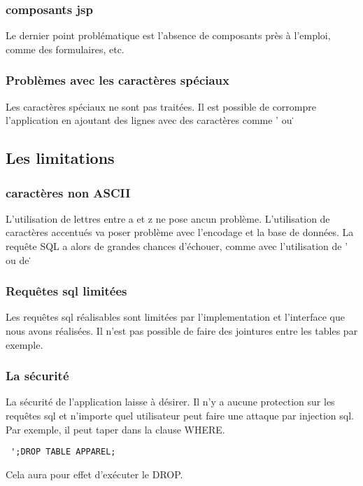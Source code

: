 \subsubsection{composants jsp}
Le dernier point problématique est l'absence de composants près à l'emploi, comme des formulaires, etc.
\subsubsection{Problèmes avec les caractères spéciaux}
Les caractères spéciaux ne sont pas traitées. Il est possible de corrompre l'application en ajoutant des lignes avec des caractères comme ' ou \.
\subsection{Les limitations}
\subsubsection{caractères non ASCII}
L'utilisation de lettres entre a et z ne pose ancun problème. L'utilisation de caractères accentués va poser problème avec l'encodage et la base de données. La requête SQL a alors de grandes chances d'échouer, comme avec l'utilisation de ' ou de \.

\subsubsection{Requêtes sql limitées}
Les requêtes sql réalisables sont limitées par l'implementation et l'interface que nous avons réalisées. Il n'est pas possible de faire des jointures entre les tables par exemple.
\subsubsection{La sécurité}
La sécurité de l'application laisse à désirer. Il n'y a aucune protection sur les requêtes sql et n'importe quel utilisateur peut faire une attaque par injection sql. 
Par exemple, il peut taper dans la clause WHERE.
\begin{verbatim}
 ';DROP TABLE APPAREL;
\end{verbatim}
Cela aura pour effet d'exécuter le DROP.


